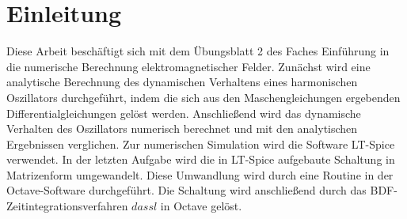 \chapter{Einleitung}\label{sec:intro}
Diese Arbeit beschäftigt sich mit dem Übungsblatt 2 des Faches \dq Einführung in die numerische Berechnung elektromagnetischer Felder\dq{}. Zunächst wird eine analytische Berechnung des dynamischen Verhaltens eines harmonischen Oszillators durchgeführt, indem die sich aus den Maschengleichungen ergebenden Differentialgleichungen gelöst werden. Anschließend wird das dynamische Verhalten des Oszillators numerisch berechnet und mit den analytischen Ergebnissen verglichen. Zur numerischen Simulation wird die Software \dq LT-Spice\dq{} verwendet. In der letzten Aufgabe wird die in LT-Spice aufgebaute Schaltung in Matrizenform umgewandelt. Diese Umwandlung wird durch eine Routine in der Octave-Software durchgeführt. Die Schaltung wird anschließend durch das BDF-Zeitintegrationsverfahren $dassl$ in Octave gelöst.